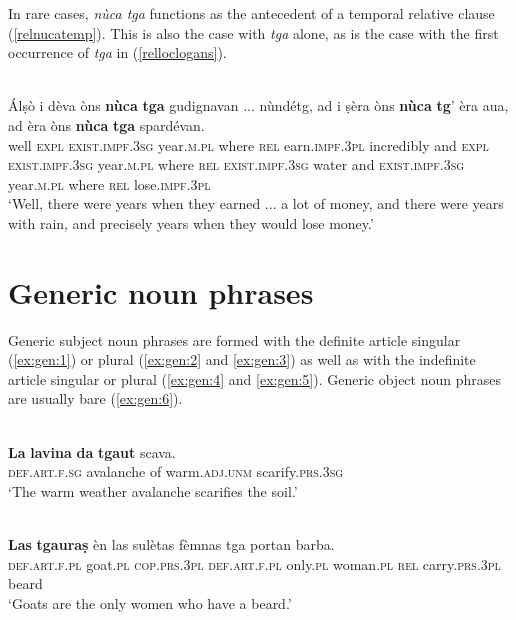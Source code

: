In rare cases, \textit{nùca tga} functions as the antecedent of a temporal relative clause (\ref{relnucatemp}). This is also the case with \textit{tga} alone, as is the case with the first occurrence of \textit{tga} in (\ref{relloclogans}).

\ea\label{relnucatemp}
\\
\gll Álṣò i dèva òns \textbf{nùca} \textbf{tga} gudignavan ... nùndétg, ad i ṣèra òns \textbf{nùca} \textbf{tg}’ èra aua, ad èra òns \textbf{nùca} \textbf{tga} spardévan.\\
well \textsc{expl} \textsc{exist.impf.3sg} year.\textsc{m.pl} where \textsc{rel} earn.\textsc{impf.3pl} {} incredibly and \textsc{expl} \textsc{exist.impf.3sg} year.\textsc{m.pl} where \textsc{rel} \textsc{exist.impf.3sg} water and \textsc{exist.impf.3sg} year.\textsc{m.pl} where \textsc{rel} lose.\textsc{impf.3pl} \\
\glt `Well, there were years when they earned ... a lot of money, and there were years with rain, and precisely years when they would lose money.'
\z

\section{Generic noun phrases}
Generic subject noun phrases are formed with the definite article singular (\ref{ex:gen:1}) or plural (\ref{ex:gen:2} and \ref{ex:gen:3}) as well as with the indefinite article singular or plural (\ref{ex:gen:4} and \ref{ex:gen:5}). Generic object noun phrases are usually bare (\ref{ex:gen:6}).

\ea
\label{ex:gen:1}
\\
\gll \textbf{La} \textbf{lavina} \textbf{da} \textbf{tgaut} scava.\\
\textsc{def.art.f.sg} avalanche of warm.\textsc{adj.unm} scarify.\textsc{prs.3sg}\\
\glt `The warm weather avalanche scarifies the soil.'
\z


\ea
\label{ex:gen:2}
\\
\gll  \textbf{Las} \textbf{tgauraṣ} èn las sulètas fèmnas tga portan barba.\\
     \textsc{def.art.f.pl} goat.\textsc{pl} \textsc{cop.prs.3pl} \textsc{def.art.f.pl} only.\textsc{pl} woman.\textsc{pl} \textsc{rel} carry.\textsc{prs.3pl} beard\\
\glt `Goats are the only women who have a beard.'
\z

